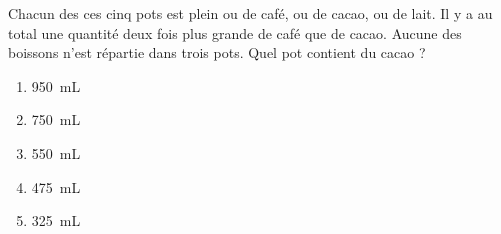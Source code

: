 Chacun des ces cinq pots est plein ou de café, ou de cacao, ou de lait. Il y a au total une quantité deux fois plus grande de café que de cacao. Aucune des boissons n'est répartie dans trois pots. Quel pot contient du cacao ?
\begin{multicols}{5}
  \begin{enumerate}[A/]
  \item 950~mL
  \item 750~mL
  \item 550~mL
  \item 475~mL
  \item 325~mL
  \end{enumerate}
\end{multicols}